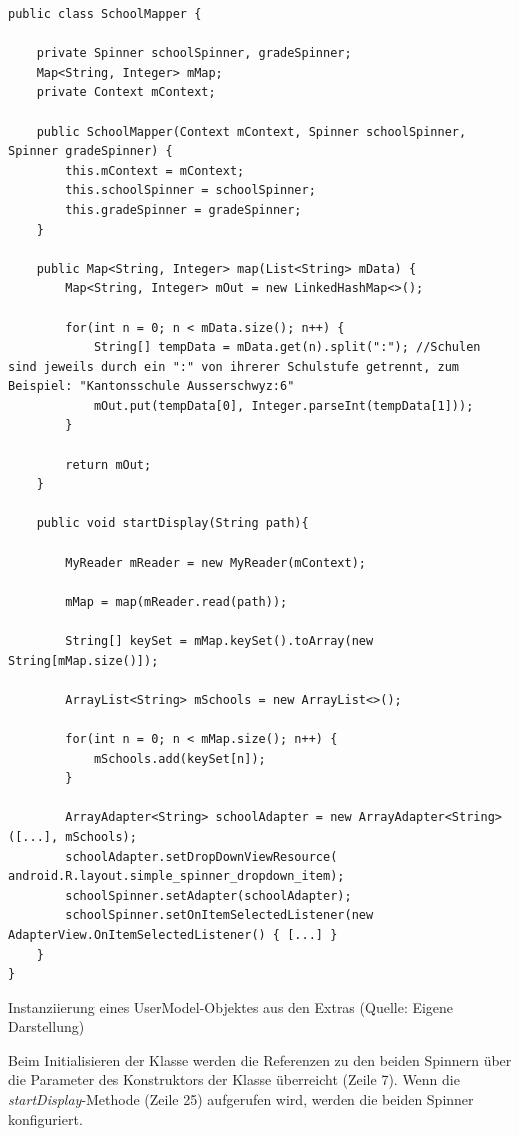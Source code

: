 \documentclass[../main.tex]{subfiles}
\begin{document}
\begin{code}
	\begin{center}
		\begin{verbatim}
public class SchoolMapper {

	private Spinner schoolSpinner, gradeSpinner;
	Map<String, Integer> mMap;
	private Context mContext;

	public SchoolMapper(Context mContext, Spinner schoolSpinner, Spinner gradeSpinner) {
		this.mContext = mContext;
		this.schoolSpinner = schoolSpinner;
		this.gradeSpinner = gradeSpinner;
	}

	public Map<String, Integer> map(List<String> mData) {
		Map<String, Integer> mOut = new LinkedHashMap<>();

		for(int n = 0; n < mData.size(); n++) {
			String[] tempData = mData.get(n).split(":"); //Schulen sind jeweils durch ein ":" von ihrerer Schulstufe getrennt, zum Beispiel: "Kantonsschule Ausserschwyz:6"
			mOut.put(tempData[0], Integer.parseInt(tempData[1]));
		}
		
		return mOut;
	}

	public void startDisplay(String path){

		MyReader mReader = new MyReader(mContext);

		mMap = map(mReader.read(path));
	
		String[] keySet = mMap.keySet().toArray(new String[mMap.size()]);

		ArrayList<String> mSchools = new ArrayList<>();

		for(int n = 0; n < mMap.size(); n++) {
			mSchools.add(keySet[n]);
		}

		ArrayAdapter<String> schoolAdapter = new ArrayAdapter<String>([...], mSchools);
		schoolAdapter.setDropDownViewResource( android.R.layout.simple_spinner_dropdown_item);
		schoolSpinner.setAdapter(schoolAdapter);
		schoolSpinner.setOnItemSelectedListener(new AdapterView.OnItemSelectedListener() { [...] }
	}
}	
		\end{verbatim}
		\caption{Instanziierung eines UserModel-Objektes aus den Extras (Quelle: Eigene Darstellung)}
		\label{schoolMapper}
	\end{center}
\end{code}

	Beim Initialisieren der Klasse werden die Referenzen zu den beiden Spinnern über die Parameter des Konstruktors der Klasse überreicht (Zeile 7). Wenn die \emph{startDisplay}-Methode (Zeile 25) aufgerufen wird, werden die beiden Spinner konfiguriert. 
	
\end{document}
